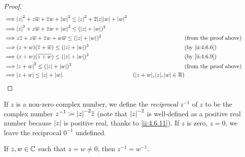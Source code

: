 \begin{proof}
\begin{align*}
    \implies & \abs{z}^2 + z \overline{w} + \overline{z} w + \abs{w}^2 \leq \abs{z}^2 + 2 \abs{z} \abs{w} + \abs{w}^2                                                                          \\
    \implies & \abs{z}^2 + z \overline{w} + \overline{z} w + \abs{w}^2 \leq (\abs{z} + \abs{w})^2                                                                                              \\
    \implies & z \overline{z} + z \overline{w} + \overline{z} w + w \overline{w} \leq (\abs{z} + \abs{w})^2           &                                        & \text{(from the proof above)} \\
    \implies & (z + w) (\overline{z} + \overline{w}) \leq (\abs{z} + \abs{w})^2                                       &                                        & \by{ii:4.6.6}                 \\
    \implies & (z + w) (\overline{z + w}) \leq (\abs{z} + \abs{w})^2                                                  &                                        & \by{ii:4.6.9}                 \\
    \implies & \abs{z + w}^2 \leq (\abs{z} + \abs{w})^2                                                               &                                        & \text{(from the proof above)} \\
    \implies & \abs{z + w} \leq \abs{z} + \abs{w}.                                                                    & (\abs{z + w}, \abs{z}, \abs{w} \in \R)
  \end{align*}
\end{proof}

\begin{defn}\label{ii:4.6.12}
  If \(z\) is a non-zero complex number, we define the \emph{reciprocal} \(z^{-1}\) of \(z\) to be the complex number \(z^{-1} \coloneqq \abs{z}^{-2} \overline{z}\)
  (note that \(\left\lvert z\right\rvert^{-2}\) is well-defined as a positive real number because \(\left\lvert z\right\rvert\) is positive real, thanks to \cref{ii:4.6.11}).
  If \(z\) is zero, \(z = 0\), we leave the reciprocal \(0^{-1}\) undefined.
\end{defn}

\begin{ac}\label{ii:ac:4.6.5}
  If \(z, w \in \mathbb{C}\) such that \(z = w \neq 0\), then \(z^{-1} = w^{-1}\).
\end{ac}

